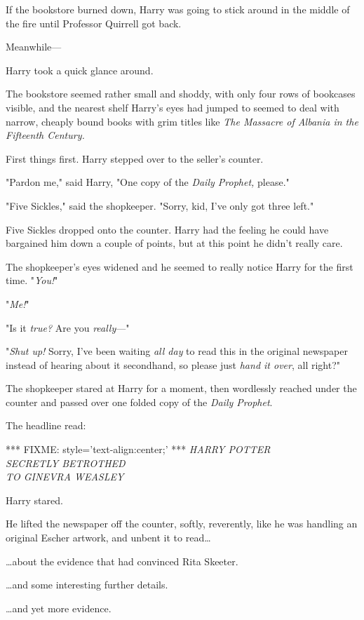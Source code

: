 If the bookstore burned down, Harry was going to stick around in the middle of 
the fire until Professor Quirrell got back.

Meanwhile---

Harry took a quick glance around.

The bookstore seemed rather small and shoddy, with only four rows of bookcases 
visible, and the nearest shelf Harry's eyes had jumped to seemed to deal with 
narrow, cheaply bound books with grim titles like \emph{The Massacre of Albania 
in the Fifteenth Century.}

First things first. Harry stepped over to the seller's counter.

"Pardon me," said Harry, "One copy of the \emph{Daily Prophet,} please."

"Five Sickles," said the shopkeeper. "Sorry, kid, I've only got three left."

Five Sickles dropped onto the counter. Harry had the feeling he could have 
bargained him down a couple of points, but at this point he didn't really care.

The shopkeeper's eyes widened and he seemed to really notice Harry for the 
first time. "\emph{You!}"

"\emph{Me!}"

"Is it \emph{true?} Are you \emph{really}---"

"\emph{Shut up!} Sorry, I've been waiting \emph{all day} to read this in the 
original newspaper instead of hearing about it secondhand, so please just 
\emph{hand it over}, all right?"

The shopkeeper stared at Harry for a moment, then wordlessly reached under the 
counter and passed over one folded copy of the \emph{Daily Prophet}.

The headline read:

*** FIXME: style='text-align:center;' ***
\emph{HARRY POTTER\\
SECRETLY BETROTHED\\
TO GINEVRA WEASLEY}

Harry stared.

He lifted the newspaper off the counter, softly, reverently, like he was 
handling an original Escher artwork, and unbent it to read{\ldots}

{\ldots}about the evidence that had convinced Rita Skeeter.

{\ldots}and some interesting further details.

{\ldots}and yet more evidence.

